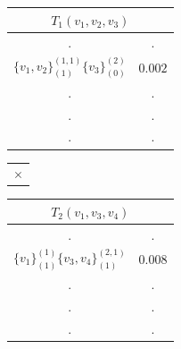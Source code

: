 \documentclass[11pt]{article}
\begin{document}
\begin{table}[!htb]
    \begin{minipage}{.3\linewidth}
      \centering
     \begin{tabular}{cc}
\multicolumn{2}{c}{$T_1(v_1,v_2,v_3)$}                           \\ \hline
\multicolumn{1}{|c}{.} & \multicolumn{1}{|c|}{.} \\ \hline
\multicolumn{1}{|l}{$\{v_1,v_2\}^{(1,1)}_{(1)} \{v_3\}^{(2)}_{(0)}$} & \multicolumn{1}{|l|}{$0.002$} \\ \hline
                             \multicolumn{1}{|c}{.} & \multicolumn{1}{|c|}{.} \\ \hline               
                   \multicolumn{1}{|c}{.} & \multicolumn{1}{|c|}{.} \\ \hline
                   \multicolumn{1}{|c}{.} & \multicolumn{1}{|c|}{.} \\ \hline        
\end{tabular}
    \end{minipage}%
    \begin{minipage}{.05\linewidth}
        \begin{tabular}{c}
     $ \times$\\
        \end{tabular}
    \end{minipage}%
     \begin{minipage}{.3\linewidth}
      \centering
     \begin{tabular}{cc}
\multicolumn{2}{c}{$T_2(v_1,v_3,v_4)$}                           \\ \hline
\multicolumn{1}{|c}{.} & \multicolumn{1}{|c|}{.} \\ \hline
\multicolumn{1}{|l}{$\{v_1\}^{(1)}_{(1)}\{v_3,v_4\}^{(2,1)}_{(1)}$} & \multicolumn{1}{|l|}{$0.008$} \\ \hline
                   \multicolumn{1}{|c}{.} & \multicolumn{1}{|c|}{.} \\ \hline               
                   \multicolumn{1}{|c}{.} & \multicolumn{1}{|c|}{.} \\ \hline
                   \multicolumn{1}{|c}{.} & \multicolumn{1}{|c|}{.} \\ \hline        
\end{tabular}
    \end{minipage}%
      \begin{minipage}{.06\linewidth}
        \begin{tabular}{c}

\end{tabular}
\end{minipage}
\end{table}
\end{document}

